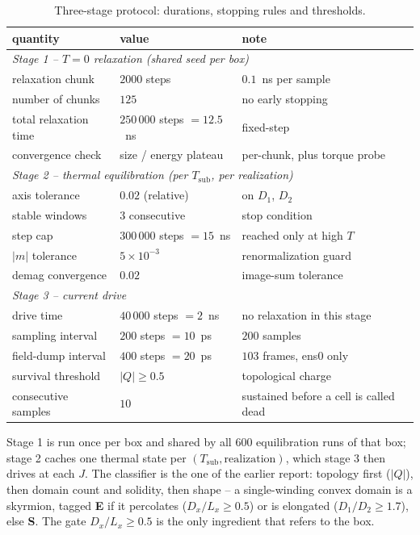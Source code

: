 \documentclass[11pt]{article}
\newcommand{\Q}{\lvert Q\rvert}
\begin{document}
\begin{table}[H]
\centering
\caption{Three-stage protocol: durations, stopping rules and
thresholds.}
\begin{tabular}{lll}
\toprule
quantity & value & note\\
\midrule
\multicolumn{3}{l}{\emph{Stage 1 -- $T=0$ relaxation (shared seed
per box)}}\\
relaxation chunk      & $2000$ steps & $0.1$~ns per sample\\
number of chunks      & $125$ & no early stopping\\
total relaxation time & $250\,000$ steps $=12.5$~ns & fixed-step\\
convergence check     & size / energy plateau
                      & per-chunk, plus torque probe\\
\midrule
\multicolumn{3}{l}{\emph{Stage 2 -- thermal equilibration (per
$T_{\mathrm{sub}}$, per realization)}}\\
axis tolerance        & $0.02$ (relative) & on $D_1$, $D_2$\\
stable windows        & $3$ consecutive & stop condition\\
step cap              & $300\,000$ steps $=15$~ns
                      & reached only at high $T$\\
$\lvert m\rvert$ tolerance & $5\times10^{-3}$
                      & renormalization guard\\
demag convergence     & $0.02$ & image-sum tolerance\\
\midrule
\multicolumn{3}{l}{\emph{Stage 3 -- current drive}}\\
drive time            & $40\,000$ steps $=2$~ns
                      & no relaxation in this stage\\
sampling interval     & $200$ steps $=10$~ps & $200$ samples\\
field-dump interval   & $400$ steps $=20$~ps
                      & $103$ frames, ens0 only\\
survival threshold    & $\Q\ge0.5$ & topological charge\\
consecutive samples   & $10$ & sustained before a cell is called dead\\
\bottomrule
\end{tabular}
\end{table}

\noindent Stage 1 is run once per box and shared by all $600$
equilibration runs of that box; stage 2 caches one thermal state per
$(T_{\mathrm{sub}},\text{realization})$, which stage 3 then drives at
each $J$. The classifier is the one of the earlier report: topology
first ($\Q$), then domain count and solidity, then shape -- a
single-winding convex domain is a skyrmion, tagged \textbf{E} if it
percolates ($D_x/L_x\ge0.5$) or is elongated ($D_1/D_2\ge1.7$), else
\textbf{S}. The gate $D_x/L_x\ge0.5$ is the only ingredient that
refers to the box.
\end{document}
